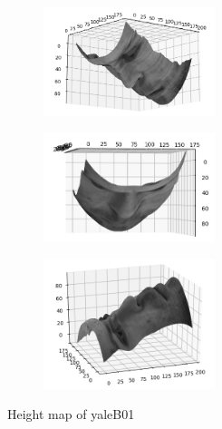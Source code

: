 \documentclass{math}
\begin{document}
\begin{figure}[H]
  \begin{subfigure}{0.33\linewidth}
    \centering
    \includegraphics[width=5cm]{assets/hw_03_height_map_01.png}
  \end{subfigure}
  \begin{subfigure}{0.33\linewidth}
    \centering
    \includegraphics[width=5cm]{assets/hw_03_height_map_02.png}
  \end{subfigure}
  \begin{subfigure}{0.33\linewidth}
    \centering
    \includegraphics[width=5cm]{assets/hw_03_height_map_03.png}
  \end{subfigure}
  \caption{Height map of yaleB01}
\end{figure}
\end{document}
